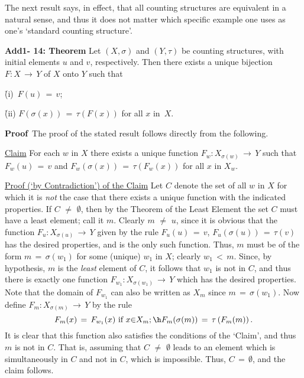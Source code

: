 {\V
\V


        The next result says, in effect, that all counting structures are equivalent in a natural sense,
    and thus it does not matter which specific example one uses as one's `standard counting structure'.

\V

        {\bf Add1- 14: Theorem} Let $(X,{\sigma})$ and $(Y,{\tau})$ be counting structures, with initial elements $u$ and $v$, respectively.
    Then there exists a unique bijection $F:X \,{\rightarrow}\, Y$ of $X$ onto $Y$ such that

        \h (i)\, $F(u) \,=\, v$;

        \h (ii) $F({\sigma}(x)) \,=\, {\tau}\left(F(x)\right)$ for all $x$ in~$X$.

\V

        {\bf Proof}\,  The proof of the stated result follows directly from the following.

        \underline{Claim} For each $w$ in $X$ there exists a unique function $F_{w}: X_{{\sigma}(w)} \,{\rightarrow}\, Y$
    such that $F_{w}(u) \,=\, v$ and $F_{w}({\sigma}(x)) \,=\, {\tau}\left(F_{w}(x)\right)$ for all $x$ in $X_{w}$.

        \underline{Proof (`by Contradiction') of the Claim} Let $C$ denote the set of all $w$ in $X$ for which it is {\em not}
    the case that there exists a unique function with the indicated properties.
    If $C \,\,{\neq}\,\, {\emptyset}$, then by the Theorem of the Least Element the set $C$ must have a least element; call it $m$.
    Clearly $m \,\,{\neq}\,\, u$, since it is obvious that the function $F_{u}:X_{{\sigma}(u)} \,{\rightarrow}\, Y$ given by the rule $F_{u}(u) \,=\, v$, $F_{u}({\sigma}(u)) \,=\, {\tau}(v)$ has the desired properties, and is the only such function.
    Thus, $m$ must be of the form $m \,=\, {\sigma}(w_{1})$ for some (unique) $w_{1}$ in $X$; clearly $w_{1}\,<\,m$.
    Since, by hypothesis, $m$ is the {\em least} element of $C$, it follows that $w_{1}$ is not in $C$,
    and thus there is exactly one function $F_{w_{1}}:X_{{\sigma}(w_{1})} \,{\rightarrow}\, Y$ which has the desired properties.
    Note that the domain of $F_{w_{1}}$ can also be written as $X_{m}$ since $m \,=\, {\sigma}(w_{1})$.
    Now define $F_{m}:X_{{\sigma}(m)} \,{\rightarrow}\, Y$ by the rule
        \begin{displaymath}
        F_{m}(x) \,=\, F_{w_{1}}(x) \mbox{ if $x{\in}X_{m}$}; \h F_{m}({\sigma}(m)) \,=\, {\tau}\left(F_{m}(m)\right).
        \end{displaymath}
    It is clear that this function also satisfies the conditions of the `Claim', and thus $m$ is not in $C$.
    That is, assuming that $C \,\,{\neq}\,\, {\emptyset}$ leads to an element which is simultaneously in $C$ and not in $C$, which is impossible.
    Thus, $C \,=\, {\emptyset}$, and the claim follows.

}
